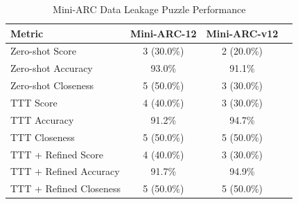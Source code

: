 \documentclass[10pt,twocolumn]{article}
\begin{document}
\begin{table}[h]
  \centering
  \caption{Mini-ARC Data Leakage Puzzle Performance}
  \begin{tabular}{lccc}
    \toprule
    \textbf{\footnotesize{Metric}} & \textbf{\footnotesize{Mini-ARC-12}} &
    \textbf{\footnotesize{Mini-ARC-v12}} \\
    \midrule
    \small{Zero-shot Score} & 3 (30.0\%) & 2 (20.0\%)  \\
    \small{Zero-shot Accuracy} & 93.0\% & 91.1\%  \\
    \small{Zero-shot Closeness} & 5 (50.0\%) & 3 (30.0\%)  \\
    \addlinespace
    \cmidrule{1-3}
    \small{TTT Score} & 4 (40.0\%) & 3 (30.0\%)  \\
    \small{TTT Accuracy} & 91.2\% & 94.7\%  \\
    \small{TTT Closeness} & 5 (50.0\%) & 5 (50.0\%) \\
    \addlinespace
    \cmidrule{1-3}
    \small{TTT + Refined Score} & 4 (40.0\%) & 3 (30.0\%)  \\
    \small{TTT + Refined Accuracy} & 91.7\% & 94.9\%  \\
    \small{TTT + Refined Closeness} & 5 (50.0\%) & 5 (50.0\%)  \\
    \bottomrule
  \end{tabular}
  \label{tab:leakage-performance}
\end{table}
\end{document}
